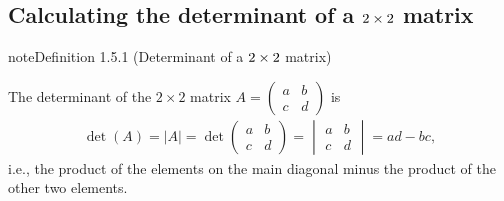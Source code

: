 \documentclass[letterpaper,10pt,english]{jupyterBook}
\begin{document}
\subsection{Calculating the determinant of a \protect\(2 \times 2\protect\) matrix}
\label{\detokenize{_pages/1.4_Determinants:calculating-the-determinant-of-a-2-times-2-matrix}}\label{_pages/1.4_Determinants:2x2-determinant-definition}
\begin{sphinxadmonition}{note}{Definition 1.5.1 (Determinant of a \protect\(2 \times 2\protect\) matrix)}



\sphinxAtStartPar
The determinant of the \(2 \times 2\) matrix \(A = \begin{pmatrix}a & b \\ c & d \end{pmatrix}\) is
\begin{equation}\label{equation:_pages/1.4_Determinants:2x2-determinant-equation}
\begin{split} \det(A) = |A| = \det \begin{pmatrix} a & b \\ c & d \end{pmatrix} =
\begin{vmatrix} a & b \\ c & d \end{vmatrix} = ad - bc, \end{split}
\end{equation}
\sphinxAtStartPar
i.e., the product of the elements on the main diagonal minus the product of the other two elements.
\end{sphinxadmonition}
\end{document}

